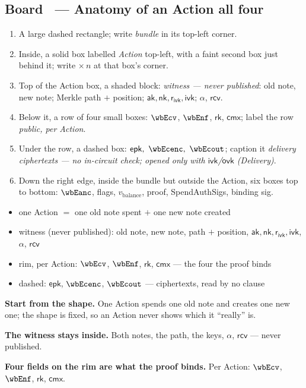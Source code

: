 \documentclass[11pt,a4paper]{article}
\makeatletter
\newcommand{\cmx}{\ensuremath{\mathsf{cmx}}}
\newcommand{\rksym}{\ensuremath{\mathsf{rk}}}
\newcommand{\aksym}{\ensuremath{\mathsf{ak}}}
\newcommand{\nksym}{\ensuremath{\mathsf{nk}}}
\newcommand{\ivk}{\ensuremath{\mathsf{ivk}}}
\newcommand{\ovk}{\ensuremath{\mathsf{ovk}}}
\newcommand{\rcv}{\ensuremath{\mathsf{rcv}}}
\newcommand{\rivk}{\ensuremath{\mathsf{r_{ivk}}}}
\newcommand{\epk}{\ensuremath{\mathsf{epk}}}
\newcounter{board}
\newenvironment{board}[2]{\stepcounter{board}%
  \subsection*{Board \theboard\ --- #1 \hfill {\normalfont\small\color{arb}#2}}}{\medskip}
\newcommand{\Draw}{\draw@head{Draw}}
\newcommand{\Write}{\draw@head{Write}}
\newcommand{\Say}{\draw@head{Say}}
\makeatother
\begin{document}
\begin{board}{Anatomy of an Action}{all four}
\Draw
\begin{enumerate}
  \item A large dashed rectangle; write \emph{bundle} in its top-left
    corner.
  \item Inside, a solid box labelled \emph{Action} top-left, with a faint
    second box just behind it; write $\times\,n$ at that box's corner.
  \item Top of the Action box, a shaded block: \emph{witness --- never
    published}: old note, new note; Merkle path $+$ position;
    $\aksym, \nksym, \rivk, \ivk$; $\alpha$, $\rcv$.
  \item Below it, a row of four small boxes: $\wbEcv$, $\wbEnf$,
    $\rksym$, $\cmx$; label the row \emph{public, per Action}.
  \item Under the row, a dashed box: $\epk,\ \wbEcenc,\ \wbEcout$;
    caption it \emph{delivery ciphertexts --- no in-circuit check; opened
    only with $\ivk$/$\ovk$ (Delivery)}.
  \item Down the right edge, inside the bundle but outside the Action,
    six boxes top to bottom: $\wbEanc$, flags, $v_{\mathrm{balance}}$,
    proof, SpendAuthSigs, binding sig.
\end{enumerate}
\begin{center}\wbEActionBox\end{center}
\Write
\begin{itemize}
  \item one Action $=$ one old note spent $+$ one new note created
  \item witness (never published): old note, new note, path $+$
    position, $\aksym, \nksym, \rivk, \ivk$, $\alpha$, $\rcv$
  \item rim, per Action: $\wbEcv$, $\wbEnf$, $\rksym$, $\cmx$ --- the four
    the proof binds
  \item dashed: $\epk$, $\wbEcenc$, $\wbEcout$ --- ciphertexts, read by no
    clause
\end{itemize}
\Say
\textbf{Start from the shape.} One Action spends one old note and
creates one new one; the shape is fixed, so an Action never shows which
it ``really'' is.

\textbf{The witness stays inside.} Both notes, the path, the keys,
$\alpha$, $\rcv$ --- never published.

\textbf{Four fields on the rim are what the proof binds.} Per Action:
$\wbEcv$, $\wbEnf$, $\rksym$, $\cmx$.


\end{board}
\end{document}
